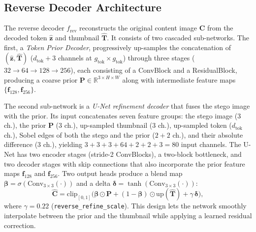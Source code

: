 \documentclass[conference]{IEEEtran}
\begin{document}
\subsection{Reverse Decoder Architecture}
\label{sec:revdec}
The reverse decoder $f_{\text{rev}}$ reconstructs the original content image $\mathbf{C}$ from the decoded token $\hat{\mathbf{z}}$ and thumbnail $\hat{\mathbf{T}}$. It consists of two cascaded sub-networks. The first, a \emph{Token Prior Decoder}, progressively up-samples the concatenation of $(\hat{\mathbf{z}},\hat{\mathbf{T}})$ ($d_{\text{tok}}{+}3$ channels at $g_{\text{tok}}\!\times\!g_{\text{tok}}$) through three stages ($32\!\to\!64\!\to\!128\!\to\!256$), each consisting of a ConvBlock and a ResidualBlock, producing a coarse prior $\mathbf{P}\!\in\!\mathbb{R}^{3\times H\times W}$ along with intermediate feature maps $\{\mathbf{f}_{128},\mathbf{f}_{256}\}$.

The second sub-network is a \emph{U-Net refinement decoder} that fuses the stego image with the prior. Its input concatenates seven feature groups: the stego image ($3$ ch.), the prior $\mathbf{P}$ ($3$ ch.), up-sampled thumbnail ($3$ ch.), up-sampled token ($d_{\text{tok}}$ ch.), Sobel edges of both the stego and the prior ($2{+}2$ ch.), and their absolute difference ($3$ ch.), yielding $3{+}3{+}3{+}64{+}2{+}2{+}3=80$ input channels. The U-Net has two encoder stages (stride-2 ConvBlocks), a two-block bottleneck, and two decoder stages with skip connections that also incorporate the prior feature maps $\mathbf{f}_{128}$ and $\mathbf{f}_{256}$. Two output heads produce a blend map $\boldsymbol{\beta}=\sigma(\text{Conv}_{3\times3}(\cdot))$ and a delta $\boldsymbol{\delta}=\tanh(\text{Conv}_{3\times3}(\cdot))$:
\begin{equation}
    \hat{\mathbf{C}} = \mathrm{clip}_{[0,1]}\!\Big(\boldsymbol{\beta}\odot\mathbf{P} + (1{-}\boldsymbol{\beta})\odot\mathrm{up}(\hat{\mathbf{T}}) + \gamma\,\boldsymbol{\delta}\Big),
    \label{eq:revdec}
\end{equation}
where $\gamma\!=\!0.22$ (\texttt{reverse\_refine\_scale}). This design lets the network smoothly interpolate between the prior and the thumbnail while applying a learned residual correction.
\end{document}
